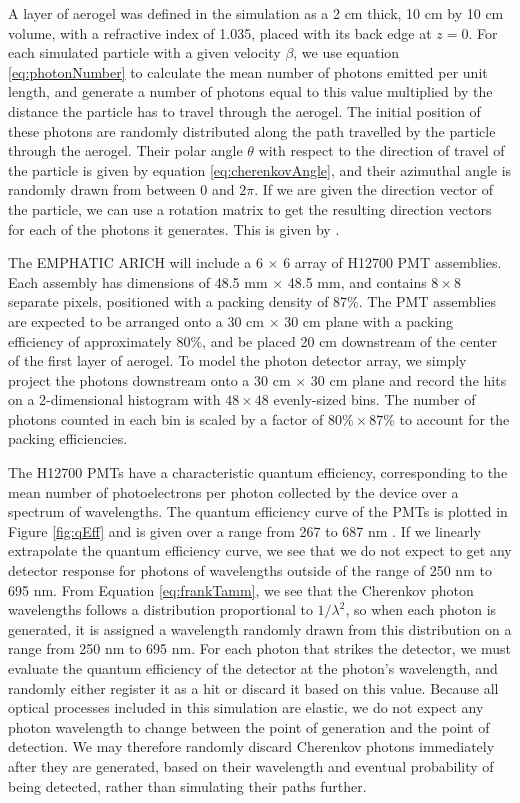 A layer of aerogel was defined in the simulation as a 2 cm thick, 10 cm by 10 cm volume, with a refractive index of 1.035, placed with its back edge at $z=0$.
For each simulated particle with a given velocity $\beta$, we use equation \ref{eq:photonNumber} to calculate the mean number of photons emitted per unit length, and generate a number of photons equal to this value multiplied by the distance the particle has to travel through the aerogel.
The initial position of these photons are randomly distributed along the path travelled by the particle through the aerogel.
Their polar angle $\theta$ with respect to the direction of travel of the particle is given by equation \ref{eq:cherenkovAngle}, and their azimuthal angle is randomly drawn from between 0 and $2\pi$.
If we are given the direction vector of the particle, we can use a rotation matrix to get the resulting direction vectors for each of the photons it generates.
This is given by .

The EMPHATIC ARICH will include a 6 $\times$ 6 array of H12700 PMT assemblies. 
Each assembly has dimensions of 48.5 mm $\times$ 48.5 mm, and contains $8 \times 8$ separate pixels, positioned with a packing density of 87\%. 
The PMT assemblies are expected to be arranged onto a 30 cm $\times$ 30 cm plane with a packing efficiency of approximately $80\%$, and be placed 20 cm downstream of the center of the first layer of aerogel.
To model the photon detector array, we simply project the photons downstream onto a 30 cm $\times$ 30 cm plane and record the hits on a 2-dimensional histogram with $48 \times 48$ evenly-sized bins.
The number of photons counted in each bin is scaled by a factor of $80\% \times 87\%$ to account for the packing efficiencies.

The H12700 PMTs have a characteristic quantum efficiency, corresponding to the mean number of photoelectrons per photon collected by the device over a spectrum of wavelengths.
The quantum efficiency curve of the PMTs is plotted in Figure \ref{fig:qEff} and is given over a range from 267 to 687 nm  \cite{H12700} .
If we linearly extrapolate the quantum efficiency curve, we see that we do not expect to get any detector response for photons of wavelengths outside of the range of 250 nm to 695 nm.
From Equation \ref{eq:frankTamm}, we see that the Cherenkov photon wavelengths follows a distribution proportional to $1/\lambda^2$, so when each photon is generated, it is assigned a wavelength randomly drawn from this distribution on a range from 250 nm to 695 nm.
For each photon that strikes the detector, we must evaluate the quantum efficiency of the detector at the photon's wavelength, and randomly either register it as a hit or discard it based on this value.
Because all optical processes included in this simulation are elastic, we do not expect any photon wavelength to change between the point of generation and the point of detection.
We may therefore randomly discard Cherenkov photons immediately after they are generated, based on their wavelength and eventual probability of being detected, rather than simulating their paths further.

